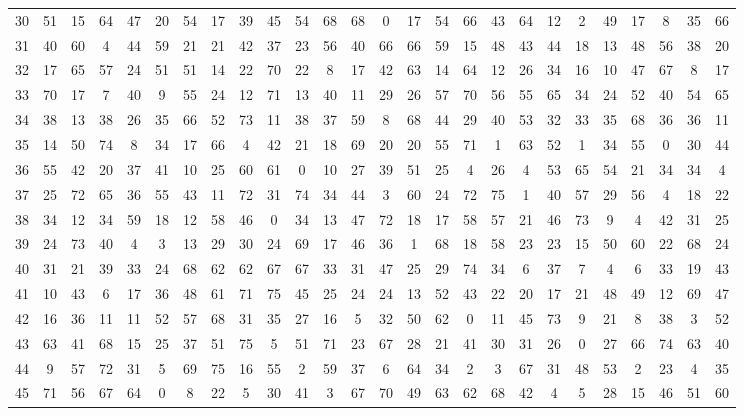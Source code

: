 \begin{table}
\begin{tabular}{c c c c c c c c c c c c c c c c c c c c c c c c c c }
30 & 51 & 15 & 64 & 47 & 20 & 54 & 17 & 39 & 45 & 54 & 68 & 68 & 0 & 17 & 54 & 66 & 43 & 64 & 12 & 2 & 49 & 17 & 8 & 35 & 66 \\
31 & 40 & 60 & 4 & 44 & 59 & 21 & 21 & 42 & 37 & 23 & 56 & 40 & 66 & 66 & 59 & 15 & 48 & 43 & 44 & 18 & 13 & 48 & 56 & 38 & 20 \\
32 & 17 & 65 & 57 & 24 & 51 & 51 & 14 & 22 & 70 & 22 & 8 & 17 & 42 & 63 & 14 & 64 & 12 & 26 & 34 & 16 & 10 & 47 & 67 & 8 & 17 \\
33 & 70 & 17 & 7 & 40 & 9 & 55 & 24 & 12 & 71 & 13 & 40 & 11 & 29 & 26 & 57 & 70 & 56 & 55 & 65 & 34 & 24 & 52 & 40 & 54 & 65 \\
34 & 38 & 13 & 38 & 26 & 35 & 66 & 52 & 73 & 11 & 38 & 37 & 59 & 8 & 68 & 44 & 29 & 40 & 53 & 32 & 33 & 35 & 68 & 36 & 36 & 11 \\
35 & 14 & 50 & 74 & 8 & 34 & 17 & 66 & 4 & 42 & 21 & 18 & 69 & 20 & 20 & 55 & 71 & 1 & 63 & 52 & 1 & 34 & 55 & 0 & 30 & 44 \\
36 & 55 & 42 & 20 & 37 & 41 & 10 & 25 & 60 & 61 & 0 & 10 & 27 & 39 & 51 & 25 & 4 & 26 & 4 & 53 & 65 & 54 & 21 & 34 & 34 & 4 \\
37 & 25 & 72 & 65 & 36 & 55 & 43 & 11 & 72 & 31 & 74 & 34 & 44 & 3 & 60 & 24 & 72 & 75 & 1 & 40 & 57 & 29 & 56 & 4 & 18 & 22 \\
38 & 34 & 12 & 34 & 59 & 18 & 12 & 58 & 46 & 0 & 34 & 13 & 47 & 72 & 18 & 17 & 58 & 57 & 21 & 46 & 73 & 9 & 4 & 42 & 31 & 25 \\
39 & 24 & 73 & 40 & 4 & 3 & 13 & 29 & 30 & 24 & 69 & 17 & 46 & 36 & 1 & 68 & 18 & 58 & 23 & 23 & 15 & 50 & 60 & 22 & 68 & 24 \\
40 & 31 & 21 & 39 & 33 & 24 & 68 & 62 & 62 & 67 & 67 & 33 & 31 & 47 & 25 & 29 & 74 & 34 & 6 & 37 & 7 & 4 & 6 & 33 & 19 & 43 \\
41 & 10 & 43 & 6 & 17 & 36 & 48 & 61 & 71 & 75 & 45 & 25 & 24 & 24 & 13 & 52 & 43 & 22 & 20 & 17 & 21 & 48 & 49 & 12 & 69 & 47 \\
42 & 16 & 36 & 11 & 11 & 52 & 57 & 68 & 31 & 35 & 27 & 16 & 5 & 32 & 50 & 62 & 0 & 11 & 45 & 73 & 9 & 21 & 8 & 38 & 3 & 52 \\
43 & 63 & 41 & 68 & 15 & 25 & 37 & 51 & 75 & 5 & 51 & 71 & 23 & 67 & 28 & 21 & 41 & 30 & 31 & 26 & 0 & 27 & 66 & 74 & 63 & 40 \\
44 & 9 & 57 & 72 & 31 & 5 & 69 & 75 & 16 & 55 & 2 & 59 & 37 & 6 & 64 & 34 & 2 & 3 & 67 & 31 & 48 & 53 & 2 & 23 & 4 & 35 \\
45 & 71 & 56 & 67 & 64 & 0 & 8 & 22 & 5 & 30 & 41 & 3 & 67 & 70 & 49 & 63 & 62 & 68 & 42 & 4 & 5 & 28 & 15 & 46 & 51 & 60 \\

\end{tabular}
\end{table}
